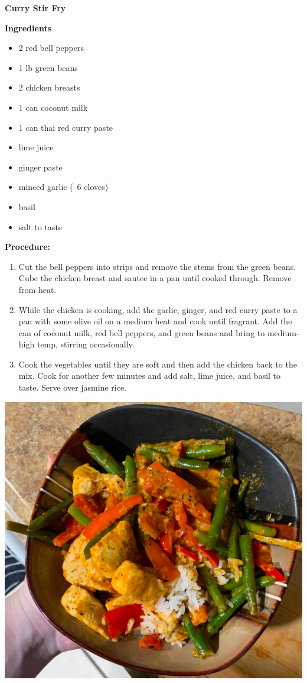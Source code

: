 \documentclass{report}
\begin{document}
\begin{centering}
    \Huge{\textbf{Curry Stir Fry}}
    
\end{centering}


\begin{multicols}{2}
\textbf{Ingredients}
\begin{itemize}
\item 2 red bell peppers

\item 1 lb green beans  
\item 2 chicken breasts
\item 1 can coconut milk
\item 1 can thai red curry paste 
\item lime juice
\item ginger paste
\item minced garlic (~6 cloves) 
\item basil 
\item salt to taste



\end{itemize}


\columnbreak
\textbf{Procedure:}
\medskip


\begin{enumerate}

\item Cut the bell peppers into strips and remove the stems from the green beans. Cube the chicken breast and sautee in a pan until cooked through. Remove from heat. 
\medskip

\item While the chicken is cooking, add the garlic, ginger, and red curry paste to a pan with some olive oil on a medium heat and cook until fragrant. Add the can of coconut milk, red bell peppers, and green beans and bring to medium-high temp, stirring occasionally. 
\newline 

 \item Cook the vegetables until they are soft and then add the chicken back to the mix. Cook for another few minutes and add salt,  lime juice, and basil to taste. Serve over jasmine rice. 
\end{enumerate}
\end{multicols}
\centering \includegraphics[scale=0.15]{Chicken Recipes/Thai Red Curry/IMG_8941-EDIT (1).jpg}
\end{document}
